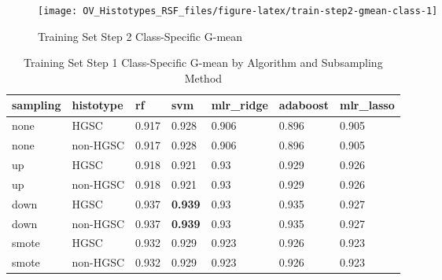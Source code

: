\documentclass[
]{report}
\begin{document}
\begin{figure}[H]

{\centering \texttt{[image: OV\_Histotypes\_RSF\_files/figure-latex/train-step2-gmean-class-1]} 

}

\caption{Training Set Step 2 Class-Specific G-mean}\label{fig:train-step2-gmean-class}
\end{figure}

\begin{table}

\caption{\label{tab:train-step1-gmean-class-table}Training Set Step 1 Class-Specific G-mean by Algorithm and Subsampling Method}
\centering
\begin{tabular}[t]{l|l|l|l|l|l|l}
\hline
sampling & histotype & rf & svm & mlr\_ridge & adaboost & mlr\_lasso\\
\hline
none & HGSC & 0.917 & 0.928 & 0.906 & 0.896 & 0.905\\
\hline
none & non-HGSC & 0.917 & 0.928 & 0.906 & 0.896 & 0.905\\
\hline
up & HGSC & 0.918 & 0.921 & 0.93 & 0.929 & 0.926\\
\hline
up & non-HGSC & 0.918 & 0.921 & 0.93 & 0.929 & 0.926\\
\hline
down & HGSC & 0.937 & \textbf{0.939} & 0.93 & 0.935 & 0.927\\
\hline
down & non-HGSC & 0.937 & \textbf{0.939} & 0.93 & 0.935 & 0.927\\
\hline
smote & HGSC & 0.932 & 0.929 & 0.923 & 0.926 & 0.923\\
\hline
smote & non-HGSC & 0.932 & 0.929 & 0.923 & 0.926 & 0.923\\
\hline
\end{tabular}
\end{table}
\end{document}

